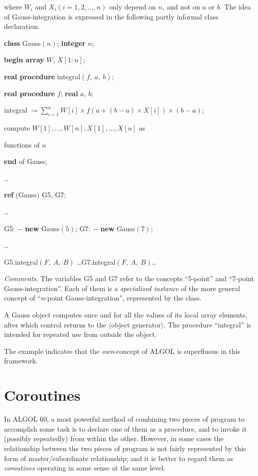 \noindent
where $W_i$ and $X_i(i = 1, 2, \dots, n)$ only depend on $n$, and not on $a$ or $b$. The idea of Gauss-integration is expressed in the following partly informal class declaration.

\quad \textbf{class} Gauss$(n)$; \textbf{integer} $n$;

\quad \textbf{begin array} $W$, $X[1:n]$;

\quad \quad \textbf{real procedure} integral$(f,\ a,\ b)$;

\quad \quad \textbf{real procedure} $f$; \textbf{real} $a$, $b$;

\quad \quad integral $\coloneq \sum_{i=1}^n W[i] \times f(a + (b - a)\times X[i])\times (b- a)$;

\quad \quad compute $W[1], \dots, W[n], X[1], \dots, X[n]$ as

\quad \quad functions of $n$

\quad \textbf{end} of Gauss;

\quad \dots

\quad \textbf{ref} $($Gauss$)$ G5, G7;

\quad \dots

\quad G5: $-$ \textbf{new} Gauss$(5)$; G7: $-$ \textbf{new} Gauss$(7)$;

\quad \dots

\quad G5.integral$(F,\ A,\ B)$ \dots G7.integral$(F,\ A,\ B)$\dots

\noindent
\textit{Comments}. The variables G5 and G7 refer to the concepts ``5-point'' and ``7-point Gauss-integration''. Each of them is a \textit{specialized instance} of the
more general concept of ``$n$-point Gauss-integration'', represented by the class.

A Gauss object computes once and for all the values of its local array elements, after which control returns to the $\langle$object generator$\rangle$. The procedure ``integral'' is intended for repeated use from outside the object.

The example indicates that the \textit{own}-concept of ALGOL is superfluous in this framework.

\section{Coroutines}

In ALGOL 60, a most powerful method of combining two pieces of program to accomplish some task is to declare one of them as a procedure, and to invoke it (possibly repeatedly) from within the other. However, in some cases the relationship between the two pieces of program is not fairly represented by this form of master$/$subordinate relationship; and it is better to regard them as \textit{coroutines} operating in some sense at the same level.

